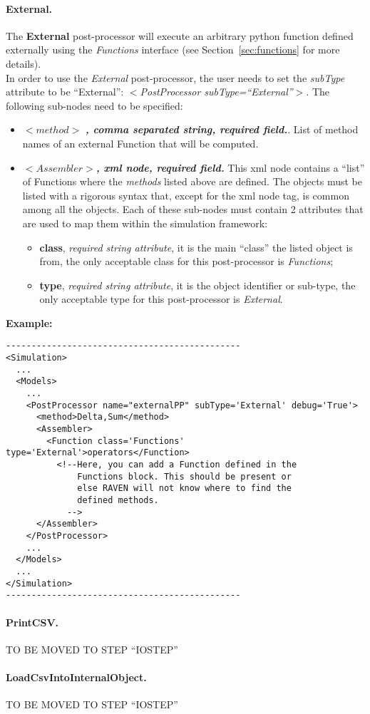 \paragraph{External.}
\label{External}
The \textbf{External} post-processor will execute an arbitrary python function
defined externally using the \textit{Functions} interface (see 
Section~\ref{sec:functions} for more details).
\\In order to use the \textit{External} post-processor, the user needs to set 
the \textit{subType} attribute to be ``External'': 
\textit{$<$PostProcessor subType=``External''$>$}. 
The following sub-nodes need to be specified:
\begin{itemize}
\item $<method>$ \textbf{\textit{, comma separated string, required field.}}.
List of method names of an external Function that will be computed.
\item $<Assembler>$\textbf{\textit{, xml node, required field.}} This xml node
contains a ``list'' of Functions where the \textit{methods} listed above are
defined. The objects must be listed with a rigorous syntax that, except for the
xml node tag, is common among all the objects. 
Each of these sub-nodes must contain 2 attributes that are used to map them
within the simulation framework:
   \begin{itemize}
     \item \textbf{class}, \textit{required string attribute}, it is the main
           ``class'' the listed object is from, the only acceptable class for
           this post-processor is \textit{Functions};
     \item \textbf{type},  \textit{required string attribute}, it is the object
           identifier or sub-type, the only acceptable type for this 
           post-processor is \textit{External}.
    \end{itemize}
\end{itemize}
\textbf{Example:}
\begin{lstlisting}[style=XML]
----------------------------------------------
<Simulation>
  ...
  <Models>
    ...
    <PostProcessor name="externalPP" subType='External' debug='True'>
      <method>Delta,Sum</method>
      <Assembler>
        <Function class='Functions' type='External'>operators</Function> 
          <!--Here, you can add a Function defined in the
              Functions block. This should be present or
              else RAVEN will not know where to find the
              defined methods.
            -->
      </Assembler>
    </PostProcessor>
    ...
  </Models>
  ...
</Simulation>
----------------------------------------------
\end{lstlisting}
\paragraph{PrintCSV.}
\label{PrintCSV}
TO BE MOVED TO STEP ``IOSTEP''
\paragraph{LoadCsvIntoInternalObject.}
\label{LoadCsvIntoInternalObject}
TO BE MOVED TO STEP ``IOSTEP''

